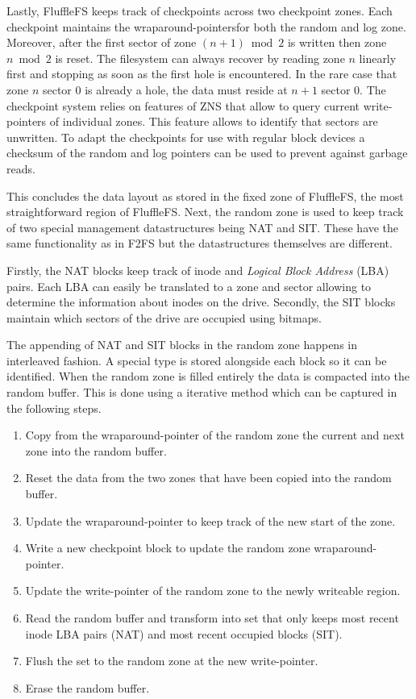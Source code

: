 Lastly, FluffleFS keeps track of checkpoints across two checkpoint zones. Each
checkpoint maintains the wraparound-pointers\footnotemark[12] for both the random
and log zone. Moreover, after the first sector of zone $(n+1) \bmod{2}$ is
written then zone $n \bmod{2}$ is reset. The filesystem can always recover by
reading zone $n$ linearly first and stopping as soon as the first hole is
encountered. In the rare case that zone $n$ sector $0$ is already a hole, the
data must reside at $n+1$ sector $0$. The checkpoint system relies on features
of ZNS that allow to query current write-pointers of individual zones. This
feature allows to identify that sectors are unwritten. To adapt the checkpoints
for use with regular block devices a checksum of the random and log pointers can
be used to prevent against garbage reads.


This concludes the data layout as stored in the fixed zone of FluffleFS, the
most straightforward region of FluffleFS. Next, the random zone is used to keep
track of two special management datastructures being NAT and SIT. These have the
same functionality as in F2FS but the datastructures themselves are different.

Firstly, the NAT blocks keep track of inode and \textit{Logical Block Address}
(LBA) pairs. Each LBA can easily be translated to a zone and sector allowing to
determine the information about inodes on the drive. Secondly, the SIT blocks
maintain which sectors of the drive are occupied using bitmaps.

The appending of NAT and SIT blocks in the random zone happens in interleaved
fashion. A special type is stored alongside each block so it can be identified.
When the random zone is filled entirely the data is compacted into the random
buffer. This is done using a iterative method which can be captured in the
following steps.

\begin{enumerate}
    \item Copy from the wraparound-pointer of the random zone the current and
    next zone into the random buffer.
    \item Reset the data from the two zones that have been copied into the
    random buffer.
    \item Update the wraparound-pointer to keep track of the new start of the
    zone.
    \item Write a new checkpoint block to update the random zone
    wraparound-pointer.
    \item Update the write-pointer of the random zone to the newly writeable
    region.
    \item Read the random buffer and transform into set that only keeps
    most recent inode LBA pairs (NAT) and most recent occupied blocks (SIT).
    \item Flush the set to the random zone at the new write-pointer.
    \item Erase the random buffer.
\end{enumerate}

